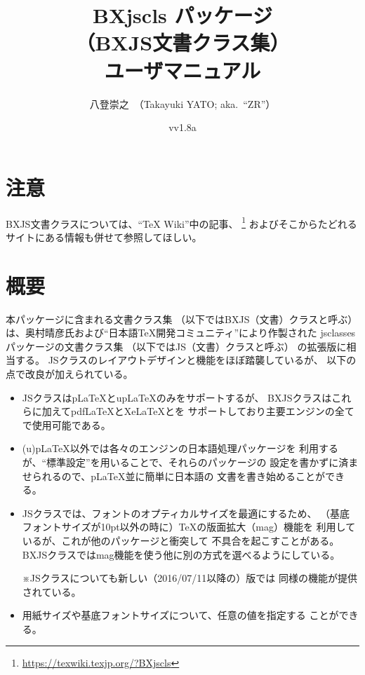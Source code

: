 \documentclass[a4paper]{ltjsarticle}
\renewcommand*{\XeLaTeX}{XeLaTeX}}
\newcommand{\PkgVersion}{v1.8a}
\newcommand{\PkgDate}{2018/03/29}
\newcommand{\Pkg}[1]{\textsf{#1}}
\newcommand{\Note}{\par\noindent ※}
\newcommand{\jemph}{\textsf}
\providecommand{\pLaTeX}{p\LaTeX}
\providecommand{\upLaTeX}{u\pLaTeX}
\providecommand{\pdfLaTeX}{pdf\LaTeX}
\begin{document}
\title{\Pkg{BXjscls} パッケージ\\
  （BXJS文書クラス集）\\
  ユーザマニュアル}
\author{八登崇之\ （Takayuki YATO; aka.~``ZR''）}
\date{v\PkgVersion\quad[\PkgDate]}
\maketitle
\tableofcontents

\section*{注意}

BXJS文書クラスについては、“{\TeX} Wiki”中の記事、
\footnote{\url{https://texwiki.texjp.org/?BXjscls}}%
およびそこからたどれるサイトにある情報も併せて参照してほしい。

\section{概要}
\label{sec:Ovewview}

本パッケージに含まれる文書クラス集
（以下では\jemph{BXJS（文書）クラス}と呼ぶ）
は、奥村晴彦氏および“日本語{\TeX}開発コミュニティ”により作製された
\Pkg{jsclasses}パッケージの文書クラス集
（以下では\jemph{JS（文書）クラス}と呼ぶ）
の拡張版に相当する。
JSクラスのレイアウトデザインと機能をほぼ踏襲しているが、
以下の点で改良が加えられている。
\begin{itemize}
\item JSクラスは{\pLaTeX}と{\upLaTeX}のみをサポートするが、
  BXJSクラスはこれらに加えて{\pdfLaTeX}と{\XeLaTeX}と{\LuaLaTeX}を
  サポートしており主要エンジンの全てで使用可能である。
\item (u){\pLaTeX}以外では各々のエンジンの日本語処理パッケージを
  利用するが、“標準設定”を用いることで、それらのパッケージの
  設定を書かずに済ませられるので、{\pLaTeX}並に簡単に日本語の
  文書を書き始めることができる。
\item JSクラスでは、フォントのオプティカルサイズを最適にするため、
  （基底フォントサイズが10pt以外の時に）{\TeX}の版面拡大（mag）機能を
  利用しているが、これが他のパッケージと衝突して
  不具合を起こすことがある。
  BXJSクラスではmag機能を使う他に別の方式を選べるようにしている。
  \Note JSクラスについても新しい（2016/07/11以降の）版では
  同様の機能が提供されている。
\item 用紙サイズや基底フォントサイズについて、任意の値を指定する
  ことができる。
\end{itemize}
\end{document}
